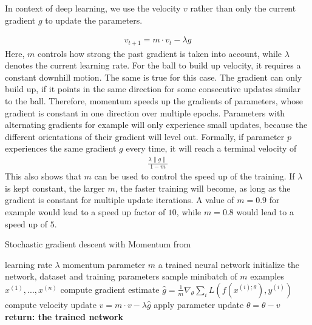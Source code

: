 In context of deep learning, we use the velocity $v$ rather than only the
current gradient $g$ to update the parameters.

\begin{align}
    v_{t+1}=m \cdot v_t - \lambda g
\end{align}
Here, $m$ controls how strong the past gradient is taken into account, while
$\lambda$ denotes the current learning rate. For the ball to build up velocity,
it requires a constant downhill motion. The same is true for this case. The
gradient can only build up, if it points in the same direction for some
consecutive updates similar to the ball. Therefore, momentum speeds up the
gradients of parameters, whose gradient is constant in one direction over
multiple epochs. Parameters with alternating gradients for example will only
experience small updates, because the different orientations of their gradient
will level out. Formally, if parameter $p$ experiences the same gradient $g$
every time, it will reach a terminal velocity of
\begin{align}
    \frac{\lambda \lVert g \rVert}{1-m}
\end{align}
This also shows that $m$ can be used to control the speed up of the
training. If $\lambda$ is kept constant, the larger $m$, the faster
training will become, as long as the gradient is constant for multiple update
iterations. A value of $m=0.9$ for example would lead to a speed up factor of
$10$, while $m=0.8$ would lead to a speed up of $5$.

\begin{algorithm}
    \hypertarget{alg:SGD_Momentum}{}
    \begin{algorithmic}[1]
        \caption{Stochastic gradient descent with Momentum from \cite{qian1999momentum}}
        \REQUIRE learning rate $\lambda$
        \REQUIRE momentum parameter $m$
        \ENSURE a trained neural network
        \STATE initialize the network, dataset and training parameters
            \STATE sample minibatch of $m$ examples ${x^{(1)}, ... ,x^{(n)}}$
            \STATE compute gradient estimate $\hat{g}=\frac{1}{m} \nabla_\theta \sum_i L(f(x^{(i);\theta}),y^{(i)})$
            \STATE compute velocity update $v=m \cdot v - \lambda \hat{g}$
            \STATE apply parameter update $\theta=\theta-v$
        \ENDWHILE
        \STATE \textbf{return: the trained network}
    \end{algorithmic}
\end{algorithm}

